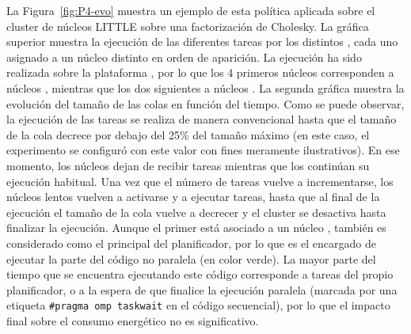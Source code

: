 La Figura~\ref{fig:P4-evo} muestra un ejemplo de esta política aplicada
sobre el cluster de núcleos LITTLE sobre una factorización de Cholesky. La
gráfica superior muestra la ejecución de las diferentes tareas por los
distintos \wts, cada uno asignado a un núcleo distinto en orden de
aparición. La ejecución ha sido realizada sobre la plataforma \juno, por lo
que los 4 primeros núcleos corresponden a núcleos \LITTLE, mientras que los
dos siguientes a núcleos \BIG. La segunda gráfica muestra la evolución del
tamaño de las colas en función del tiempo. Como se puede observar, la
ejecución de las tareas se realiza de manera convencional hasta que el
tamaño de la cola decrece por debajo del 25\% del tamaño máximo (en este
caso, el experimento se configuró con este valor con fines meramente
ilustrativos). En ese momento, los núcleos \LITTLE dejan de recibir tareas
mientras que los \BIG continúan su ejecución habitual. Una vez que el
número de tareas vuelve a incrementarse, los núcleos lentos vuelven a
activarse y a ejecutar tareas, hasta que al final de la ejecución el tamaño
de la cola vuelve a decrecer y el cluster se desactiva hasta finalizar la
ejecución. Aunque el primer \wt está asociado a un núcleo \LITTLE, también
es considerado como el \wt principal del planificador, por lo que es el
encargado de ejecutar la parte del código no paralela (en color verde). La
mayor parte del tiempo que se encuentra ejecutando este código corresponde
a tareas del propio planificador, o a la espera de que finalice la
ejecución paralela (marcada por una etiqueta \texttt{\#pragma omp taskwait}
en el código secuencial), por lo que el impacto final sobre el consumo
energético no es significativo.

